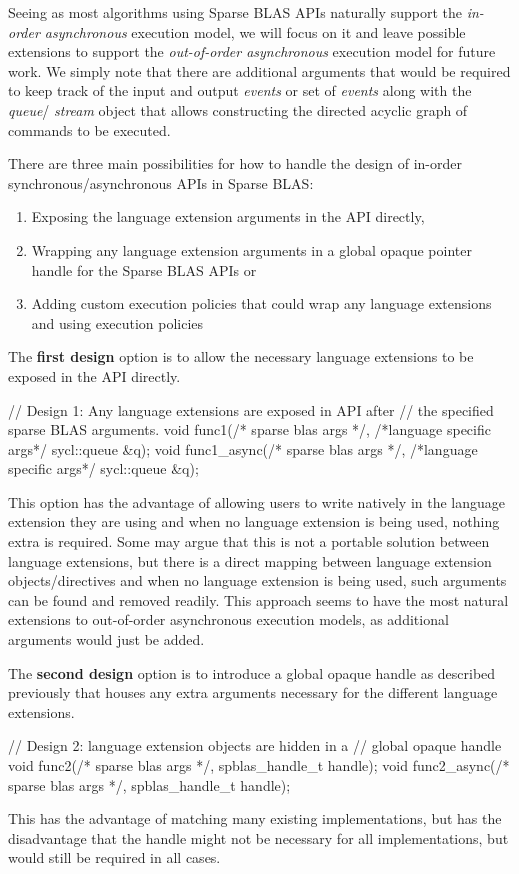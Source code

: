 Seeing as most algorithms using Sparse BLAS APIs naturally support the \textit{in-order asynchronous} execution model, we will focus on it and leave possible extensions to support the \textit{out-of-order asynchronous} execution model for future work. We simply note that there are additional arguments that would be required to keep track of the input and output \textit{events} or set of \textit{events} along with the \textit{queue}/ \textit{stream} object that allows constructing the directed acyclic graph of commands to be executed.

There are three main possibilities for how to handle the design of in-order synchronous/asynchronous APIs in Sparse BLAS:
\begin{enumerate}
    \item Exposing the language extension arguments in the API directly, 
    \item Wrapping any language extension arguments in a global opaque pointer handle for the Sparse BLAS APIs or 
    \item Adding custom execution policies that could wrap any language extensions and using execution policies 
\end{enumerate}
The \textbf{first design} option is to allow the necessary language extensions to be exposed in the API directly.
\begin{lstlistings}
// Design 1: Any language extensions are exposed in API after
//           the specified sparse BLAS arguments.
void func1(/* sparse blas args */,
           /*language specific args*/ sycl::queue &q);
void func1_async(/* sparse blas args */, 
                 /*language specific args*/ sycl::queue &q);
\end{lstlistings}
This option has the advantage of allowing users to write natively in the language extension they are using and when no language extension is being used, nothing extra is required. Some may argue that this is not a portable solution between language extensions, but there is a direct mapping between language extension objects/directives and when no language extension is being used, such arguments can be found and removed readily. This approach seems to have the most natural extensions to out-of-order asynchronous execution models, as additional arguments would just be added.

The \textbf{second design} option is to introduce a global opaque handle as described previously that houses any extra arguments necessary for the different language extensions.
\begin{lstlistings}
// Design 2: language extension objects are hidden in a
//           global opaque handle
void func2(/* sparse blas args */, spblas_handle_t handle);
void func2_async(/* sparse blas args */, spblas_handle_t handle);
\end{lstlistings}
This has the advantage of matching many existing implementations, but has the disadvantage that the handle might not be necessary for all implementations, but would still be required in all cases.

